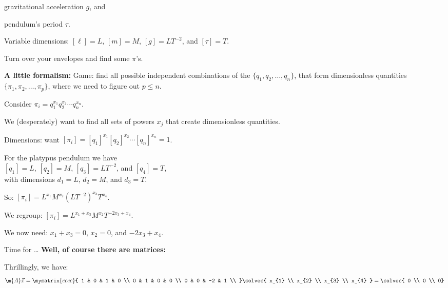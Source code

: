           gravitational
          acceleration $g$, 
          and 
         
          pendulum's period $\tau$.
      
  
      Variable dimensions:
      $[\ell] = L$, 
      $[m] = M$, 
      $[g] = L T^{-2}$,
      and $[\tau] = T$.
     
      Turn over your envelopes and find some $\pi$'s.
  \small

  \textbf{A little formalism:}
      Game: find all possible independent combinations of the
      $\{q_1, q_2, \ldots, q_n\}$,
      that form dimensionless quantities
      $\{\pi_1, \pi_2, \ldots, \pi_p\}$,
      where we need to figure out $p \le n$.
     
      Consider 
      $
      \pi_i 
      = 
      q_1^{x_{1}} 
      q_2^{x_{2}} 
      \cdots
      q_n^{x_{n}} 
      $.
    
      We (desperately) want to find all sets of powers $x_{j}$ that create dimensionless quantities.
     
      Dimensions:
      want
      $
      [\pi_i]
      = 
      [q_1]^{x_{1}} 
      [q_2]^{x_{2}} 
      \cdots
      [q_n]^{x_{n}} 
      = 
      1
      $.
    
      For the platypus pendulum we have \\
      $[q_1] = L$, $[q_2] = M$, $[q_3] = L T^{-2}$, and $[q_4] = T$,\\
    
      with dimensions
      $d_1=L$, $d_2=M$, and $d_3=T$.
    
      So:
      $
      [\pi_i]
      =
      L^{x_{1}}
      M^{x_{2}}
      (LT^{-2})^{x_{3}}
      T^{x_{4}}
      $.
    
      We regroup:
      $
      [\pi_i]
      =
      L^{x_{1} + x_{3}}
      M^{x_{2}}
      T^{-2x_{3} + x_{4}}
      $.
    
      We now need:
      $x_{1} + x_{3} = 0$,
      $x_{2} =  0$,
      and
      $-2x_{3} + x_{4}$.
    
      Time for { \ldots}
  \textbf{\small Well, of course there are matrices:}

  \small
    
      Thrillingly, we have:
      $$
      \m{A}\vec{x}
      =
      \mymatrix{cccc}{
        1 & 0 & 1 & 0 \\
        0 & 1 &  0 & 0 \\
        0 & 0 & -2 & 1 \\
      }
      \colvec{ x_{1} \\ x_{2} \\ x_{3} \\ x_{4} }
      = 
      \colvec{ 0 \\ 0 \\ 0}
      $$
    
